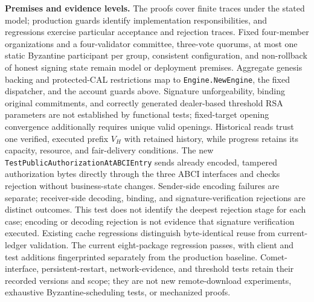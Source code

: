 \noindent\textbf{Premises and evidence levels.}
The proofs cover finite traces under the stated model; production
guards identify implementation responsibilities, and regressions
exercise particular acceptance and rejection traces.
Fixed four-member organizations and a four-validator committee,
three-vote quorums, at most one static Byzantine participant per group,
consistent configuration, and non-rollback of honest signing state remain
model or deployment premises. Aggregate genesis backing and protected-CAL
restrictions map to \texttt{Engine.NewEngine}, the fixed dispatcher,
and the account guards above.
Signature unforgeability, binding original commitments, and correctly
generated dealer-based threshold RSA parameters are not established by
functional tests; fixed-target opening convergence additionally requires
unique valid openings.
Historical reads trust one verified, executed prefix $V_H$ with retained
history, while progress retains its capacity, resource, and fair-delivery
conditions.
The new \texttt{TestPublicAuthorization\allowbreak AtABCIEntry} sends already encoded,
tampered authorization bytes directly through the three ABCI interfaces
and checks rejection without business-state changes.
Sender-side encoding failures are separate; receiver-side decoding,
binding, and signature-verification rejections are distinct outcomes.
This test does not identify the deepest rejection stage for each case;
encoding or decoding rejection is not evidence that signature verification executed.
Existing cache regressions distinguish byte-identical reuse from
current-ledger validation.
The current eight-package regression passes, with client and test
additions fingerprinted separately from the production baseline.
Comet-interface, persistent-restart, network-evidence, and threshold
tests retain their recorded versions and scope; they are not new
remote-download experiments, exhaustive Byzantine-scheduling tests,
or mechanized proofs.

